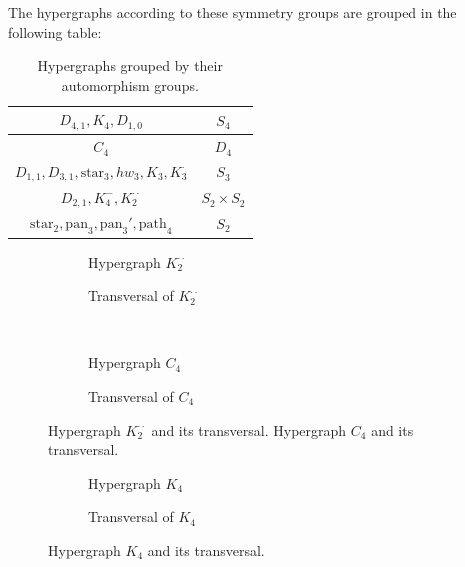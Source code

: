 The hypergraphs according to these symmetry groups are grouped in the following table:

\begin{table}[h]
\centering
\begin{tabular}{|c|c|}
\hline
$D_{4,1},K_4,D_{1,0}$ & $S_4$\\\hline
$C_4$ & $D_4$\\\hline
$D_{1,1},D_{3,1},\text{star}_3,hw_3,K_3,K_3^{\cdot}$ & $S_3$\\\hline
$D_{2,1},K_4^-,K_2^{\cdot\cdot}$ & $S_2\times S_2$\\\hline
$\text{star}_2,\text{pan}_3,\text{pan}_3',\text{path}_4$ & $S_2$\\\hline
\end{tabular}
\caption{Hypergraphs grouped by their automorphism groups.}
\end{table}

\begin{figure}[tp]
\centering
\begin{subfigure}{0.45\linewidth}\centering\caption{Hypergraph $K_2^{\cdot\cdot}$}\end{subfigure}\hfill
\begin{subfigure}{0.45\linewidth}\centering\caption{Transversal of $K_2^{\cdot\cdot}$}\end{subfigure}\\[8pt]
\begin{subfigure}{0.45\linewidth}\centering\caption{Hypergraph $C_4$}\end{subfigure}\hfill
\begin{subfigure}{0.45\linewidth}\centering\caption{Transversal of $C_4$}\end{subfigure}
\caption{Hypergraph $K_2^{\cdot\cdot}$ and its transversal. Hypergraph $C_4$ and its transversal.}\label{fig:k2dd-c4}
\end{figure}

\begin{figure}[tp]
\centering
\begin{subfigure}{0.45\linewidth}\centering\caption{Hypergraph $K_4$}\end{subfigure}\hfill
\begin{subfigure}{0.45\linewidth}\centering\caption{Transversal of $K_4$}\end{subfigure}
\caption{Hypergraph $K_4$ and its transversal.}\label{fig:k4}
\end{figure}

